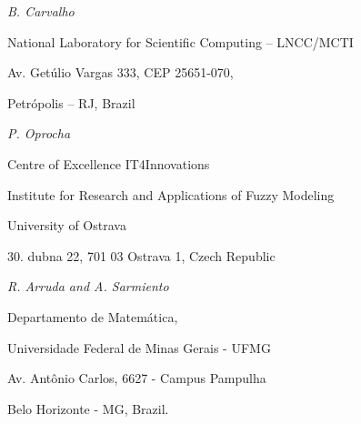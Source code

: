 \documentclass{amsart}
\theoremstyle{plain}
\theoremstyle{definition}
\begin{document}
{\em B. Carvalho}
\vspace{0.2cm}

\noindent

National Laboratory for Scientific Computing – LNCC/MCTI 

Av. Getúlio Vargas 333, CEP 25651-070, 

Petrópolis – RJ, Brazil

\vspace{0.2cm}

\vspace{1.0cm}

{\em P. Oprocha}
\vspace{0.2cm}

\noindent

Centre of Excellence IT4Innovations 

Institute for Research and Applications of Fuzzy Modeling 

University of Ostrava

30. dubna 22, 701 03 Ostrava 1, Czech Republic

\vspace{1.0cm}



{\em R. Arruda and A. Sarmiento}
\vspace{0.2cm}

\noindent

Departamento de Matem\'atica,

Universidade Federal de Minas Gerais - UFMG

Av. Ant\^onio Carlos, 6627 - Campus Pampulha

Belo Horizonte - MG, Brazil.
\vspace{0.2cm}
\end{document}
